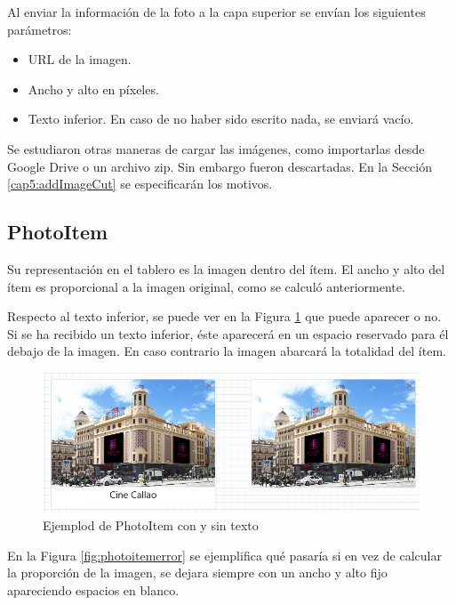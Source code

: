 Al enviar la información de la foto a la capa superior se envían los siguientes parámetros: 

\begin{itemize}
	\item URL de la imagen.
	\item Ancho y alto en píxeles.
	\item Texto inferior. En caso de no haber sido escrito nada, se enviará vacío.
\end{itemize}

Se estudiaron otras maneras de cargar las imágenes, como importarlas desde Google Drive o un archivo zip. Sin embargo fueron descartadas. En la Sección \ref{cap5:addImageCut} se especificarán los motivos. 

\subsection{PhotoItem}

Su representación en el tablero es la imagen dentro del ítem. El ancho y alto del ítem es proporcional a la imagen original, como se calculó anteriormente. 

Respecto al texto inferior, se puede ver en la Figura \ref{fig:photoitemtexto} que puede aparecer o no. Si se ha recibido un texto inferior, éste aparecerá en un espacio reservado para él debajo de la imagen. En caso contrario la imagen abarcará la totalidad del ítem.

\begin{figure}[h!]
	\centering
	\includegraphics[width=0.7\linewidth]{Imagenes/Bitmap/photoItemTexto}
	\caption{Ejemplod de PhotoItem con y sin texto}
	\label{fig:photoitemtexto}
\end{figure}


En la Figura \ref{fig:photoitemerror} se ejemplifica qué pasaría si en vez de calcular la proporción de la imagen, se dejara siempre con un ancho y alto fijo apareciendo espacios en blanco.

